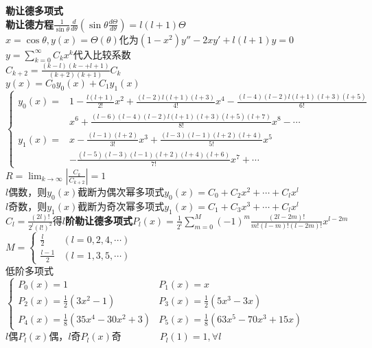 \documentclass[10pt,a4paper]{article}
\begin{document}
\begin{multicols}{2}
\textbf{勒让德多项式}\\
\textbf{勒让德方程}$\frac{1}{\sin\theta}\frac{d}{d\theta}(\sin\theta\frac{d\Theta}{d\theta})=l(l+1)\Theta$\\
$x=\cos\theta,y(x)=\Theta(\theta)$化为$(1-x^2)y''-2xy'+l(l+1)y=0$\\
\indent{}$y=\sum_{k=0}^{\infty}C_kx^k$代入比较系数\scriptsize\\
$C_{k+2}=\frac{(k-l)(k-+l+1)}{(k+2)(k+1)}C_k$\\
$y(x)=C_0y_0(x)+C_1y_1(x)$\\
\indent{}$\left\{\begin{array}{ll}y_0(x)=&1-\frac{l(l+1)}{2!}x^2+\frac{(l-2)l(l+1)(l+3)}{4!}x^4-\frac{(l-4)(l-2)l(l+1)(l+3)(l+5)}{6!}\\&x^6+\frac{(l-6)(l-4)(l-2)l(l+1)(l+3)(l+5)(l+7)}{8!}x^8-\cdots\\y_1(x)=&x-\frac{(l-1)(l+2)}{3!}x^3+\frac{(l-3)(l-1)(l+2)(l+4)}{5!}x^5\\&-\frac{(l-5)(l-3)(l-1)(l+2)(l+4)(l+6)}{7!}x^7+\cdots\end{array}\right.$\scriptsize\\
$R=\lim_{k\to\infty}|\frac{C_k}{C_{k+2}}|=1$\\
\indent{}$l$偶数，则$y_0(x)$截断为偶次幂多项式$y_0(x)=C_0+C_2x^2+\cdots+C_lx^l$\scriptsize\\
\indent{}$l$奇数，则$y_1(x)$截断为奇次幂多项式$y_1(x)=C_1+C_3x^3+\cdots+C_lx^l$\scriptsize\\
$C_l=\frac{(2l)!}{2^l(l!)^2}$得\textbf{$l$阶勒让德多项式}$P_l(x)=\frac{1}{2^l}\sum_{m=0}^M(-1)^m\frac{(2l-2m)!}{m!(l-m)!(l-2m)!}x^{l-2m}$\\
\indent{}$M=\left\{\begin{array}{ll}\frac{l}{2}&(l=0,2,4,\cdots)\\\frac{l-1}{2}&(l=1,3,5,\cdots)\end{array}\right.$\scriptsize\\
低阶多项式$\left\{\begin{array}{ll}P_0(x)=1&P_1(x)=x\\P_2(x)=\frac{1}{2}(3x^2-1)&P_3(x)=\frac{1}{2}(5x^3-3x)\\P_4(x)=\frac{1}{8}(35x^4-30x^2+3)&P_5(x)=\frac{1}{8}(63x^5-70x^3+15x)\end{array}\right.$\\
$l$偶$P_l(x)$偶，$l$奇$P_l(x)$奇~~~~~~~~$P_l(1)=1,\forall l$\\

\end{multicols}
\end{document}
